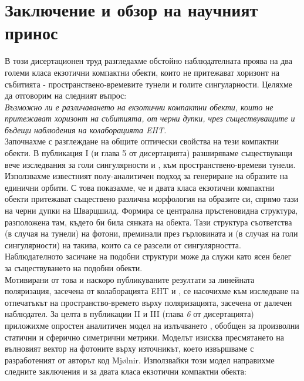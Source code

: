 \section{Заключение и обзор на научният принос}

В този дисертационен труд разгледахме обстойно наблюдателната проява на два големи класа екзотични компактни обекти, които не притежават хоризонт на събитията - пространствено-времевите тунели и голите сингуларности. Целяхме да отговорим на следният въпрос:\\

\emph{Възможно ли е различаването на екзотични компактни обекти, които не притежават хоризонт на събитията, от черни дупки, чрез съществуващите и бъдещи наблюдения на колаборацията EHT.}\\

Започнахме с разглеждане на общите оптически свойства на тези компактни обекти. В публикация I (и глава 5 от дисертацията) разширяваме съществуващи вече изследвания за голи сингулярности \cite{Gyulchev2020} и \cite{Gyulchev2021}, към пространствено-времеви тунели. Използвахме известният полу-аналитичен подход \cite{Muller2009} за генериране на образите на единични орбити. С това показахме, че и двата класа екзотични компактни обекти притежават съществено различна морфология на образите си, спрямо тази на черни дупки на Шварцшилд. Формира се централна пръстеновидна структура, разположена там, където би била сянката на обекта. Тази структура съответства (в случая на тунели) на фотони, преминали през гърловината и (в случая на голи сингулярности) на такива, които са се разсели от сингулярността. Наблюдателното засичане на подобни структури може да служи като ясен белег за съществуването на подобни обекти.\\

Мотивирани от това и наскоро публикуваните резултати за линейната поляризация, засечена от колаборацията EHT \cite{EHT_M87_VII} и \cite{EHT_M87_VIII}, се насочихме към изследване на отпечатъкът на пространство-времето върху поляризацията, засечена от далечен наблюдател. За целта в публикации II и III (глава \emph{6} от дисертацията) приложихме опростен аналитичен модел на излъчването \cite{Narayan2021}, обобщен за произволни статични и сферично симетрични метрики. Моделът изисква пресмятането на вълновият вектор на фотоните върху източникът, което извършваме с разработеният от авторът код Mjølnir. Използвайки този модел направихме следните заключения и за двата класа екзотични компактни обекта:\\


